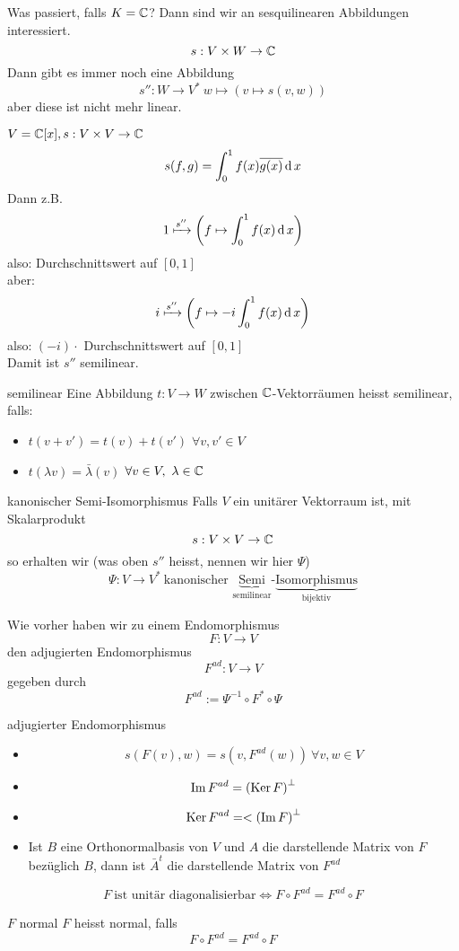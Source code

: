 \begin{Bem}
  Was passiert, falls $K=\mathbb{C}$? Dann sind wir an sesquilinearen Abbildungen interessiert.
  \[s:V\times W\to\mathbb{C}\]
  Dann gibt es immer noch eine Abbildung
  \[s'':W\to V^*\ w\mapsto\left( v\mapsto s(v,w) \right)\]
  aber diese ist nicht mehr linear.
\end{Bem}
\begin{Bsp}
  $V=\mathbb{C}[x],s:V\times V\to\mathbb{C}$
  \[s(f,g)=\int^1_0f(x)\overline{g(x)}\operatorname{d} x\]
  Dann z.B.
  \[1\xmapsto{s''}\left( f\mapsto \int_0^1f(x)\operatorname{d} x \right)\]
  also: Durchschnittswert auf $[0,1]$\\
  aber:
  \[i\xmapsto{s''}\left( f\mapsto -i\int_0^1f(x)\operatorname{d} x \right)\]
  also: $(-i)\cdot$ Durchschnittswert auf $[0,1]$\\
  Damit ist $s''$ semilinear.
\end{Bsp}
\begin{Def}{semilinear}
  Eine Abbildung $t:V\to W$ zwischen $\mathbb{C}$-Vektorräumen heisst semilinear, falls:
  \begin{itemize}
    \item $t(v+v')=t(v)+t(v')$ $\forall v,v'\in V$
    \item $t(\lambda v)=\bar\lambda(v)$ $\forall v\in V,\ \lambda\in \mathbb{C}$
  \end{itemize}
\end{Def}
\begin{Def}{kanonischer Semi-Isomorphismus}
  Falls $V$ ein unitärer Vektorraum ist, mit Skalarprodukt
  \[s:V\times V\to\mathbb{C}\]
  so erhalten wir (was oben $s''$ heisst, nennen wir hier $\Psi$)
  \[\Psi:V\to V^*\ \text{kanonischer $\underbrace{\text{Semi}}_{\text{semilinear}}$-$\underbrace{\text{Isomorphismus}}_{\text{bijektiv}}$}\]
\end{Def}
\begin{Bem}
  Wie vorher haben wir zu einem Endomorphismus
  \[F:V\to V\]
  den adjugierten Endomorphismus
  \[F^{ad}:V\to V\]
  gegeben durch
    \[F^{ad}:=\Psi^{-1}\circ F^*\circ \Psi\]
\end{Bem}
\begin{Eig}{adjugierter Endomorphismus}
  \begin{itemize}
    \item 
      \[s\left( F(v),w \right)=s\left( v,F^{ad}(w) \right)\ \forall v,w\in V\]
    \item 
      \[\operatorname{Im} F^{ad}=\left( \operatorname{Ker} F \right)^\perp\]
    \item
      \[\operatorname{Ker} F^{ad}=<\left( \operatorname{Im} F \right)^\perp\]
    \item Ist $B$ eine Orthonormalbasis von $V$ und $A$ die darstellende Matrix von $F$ bezüglich $B$, dann ist $\bar A^t$ die darstellende Matrix von $F^{ad}$
  \end{itemize}
\end{Eig}
\begin{Sat}
  \[F\ \text{ist unitär diagonalisierbar} \iff F\circ F^{ad}=F^{ad}\circ F\]
\end{Sat}
\begin{Def}{$F$ normal}
  $F$ heisst normal, falls
  \[F\circ F^{ad}=F^{ad}\circ F\]
\end{Def}
